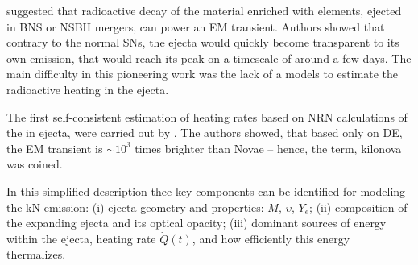 \citet{Li:1998bw} suggested that 
radioactive decay of the material enriched with \rproc{} elements,
ejected in \ac{BNS} or \ac{NSBH} mergers, can power an \ac{EM} transient.
%
Authors showed that contrary to the normal \acp{SN}, 
the ejecta would quickly become transparent to its own emission, 
that would reach its peak on a timescale of around a few days. 
%
The main difficulty in this pioneering work was the lack of a \nuc{}
models to estimate the radioactive heating in the ejecta. 


The first self-consistent estimation of heating rates based on 
\ac{NRN} calculations of the \rproc{} in ejecta, were carried out by  \citet{Metzger:2010}. 
The authors showed, that based only on \ac{DE}, the \ac{EM} 
transient is ${\sim}10^3$ times brighter than Novae -- hence, the term, 
kilonova was coined. 
%
%

In this simplified description thee key components can be 
identified for modeling the \ac{kN} emission: 
(i) ejecta geometry and properties: $M$, $\upsilon$, $Y_e$; 
(ii) composition of the expanding ejecta and its optical opacity; 
(iii) dominant sources of energy within the ejecta, heating rate $\dot{Q}(t)$, and how 
efficiently this energy thermalizes.
%

